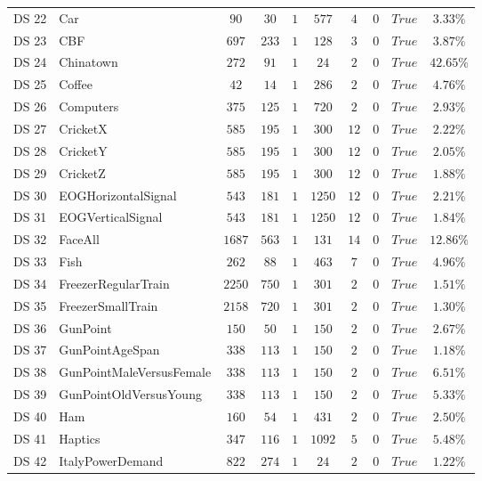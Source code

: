 {\begin{longtable}{|ll|cccccccc|}
		DS 22 & Car & $90$ & $30$ & $1$ & $577$ & $4$ & $0$ & $True$ & $3.33\%$ \\
		DS 23 & CBF & $697$ & $233$ & $1$ & $128$ & $3$ & $0$ & $True$ & $3.87\%$ \\
		DS 24 & Chinatown & $272$ & $91$ & $1$ & $24$ & $2$ & $0$ & $True$ & $42.65\%$ \\
		DS 25 & Coffee & $42$ & $14$ & $1$ & $286$ & $2$ & $0$ & $True$ & $4.76\%$ \\
		DS 26 & Computers & $375$ & $125$ & $1$ & $720$ & $2$ & $0$ & $True$ & $2.93\%$ \\
		DS 27 & CricketX & $585$ & $195$ & $1$ & $300$ & $12$ & $0$ & $True$ & $2.22\%$ \\
		DS 28 & CricketY & $585$ & $195$ & $1$ & $300$ & $12$ & $0$ & $True$ & $2.05\%$ \\
		DS 29 & CricketZ & $585$ & $195$ & $1$ & $300$ & $12$ & $0$ & $True$ & $1.88\%$ \\
		DS 30 & EOGHorizontalSignal & $543$ & $181$ & $1$ & $1250$ & $12$ & $0$ & $True$ & $2.21\%$ \\
		DS 31 & EOGVerticalSignal & $543$ & $181$ & $1$ & $1250$ & $12$ & $0$ & $True$ & $1.84\%$ \\
		DS 32 & FaceAll & $1687$ & $563$ & $1$ & $131$ & $14$ & $0$ & $True$ & $12.86\%$ \\
		DS 33 & Fish & $262$ & $88$ & $1$ & $463$ & $7$ & $0$ & $True$ & $4.96\%$ \\
		DS 34 & FreezerRegularTrain & $2250$ & $750$ & $1$ & $301$ & $2$ & $0$ & $True$ & $1.51\%$ \\
		DS 35 & FreezerSmallTrain & $2158$ & $720$ & $1$ & $301$ & $2$ & $0$ & $True$ & $1.30\%$ \\
		DS 36 & GunPoint & $150$ & $50$ & $1$ & $150$ & $2$ & $0$ & $True$ & $2.67\%$ \\
		DS 37 & GunPointAgeSpan & $338$ & $113$ & $1$ & $150$ & $2$ & $0$ & $True$ & $1.18\%$ \\
		DS 38 & GunPointMaleVersusFemale & $338$ & $113$ & $1$ & $150$ & $2$ & $0$ & $True$ & $6.51\%$ \\
		DS 39 & GunPointOldVersusYoung & $338$ & $113$ & $1$ & $150$ & $2$ & $0$ & $True$ & $5.33\%$ \\
		DS 40 & Ham & $160$ & $54$ & $1$ & $431$ & $2$ & $0$ & $True$ & $2.50\%$ \\
		DS 41 & Haptics & $347$ & $116$ & $1$ & $1092$ & $5$ & $0$ & $True$ & $5.48\%$ \\
		DS 42 & ItalyPowerDemand & $822$ & $274$ & $1$ & $24$ & $2$ & $0$ & $True$ & $1.22\%$ \\

\end{longtable}}
